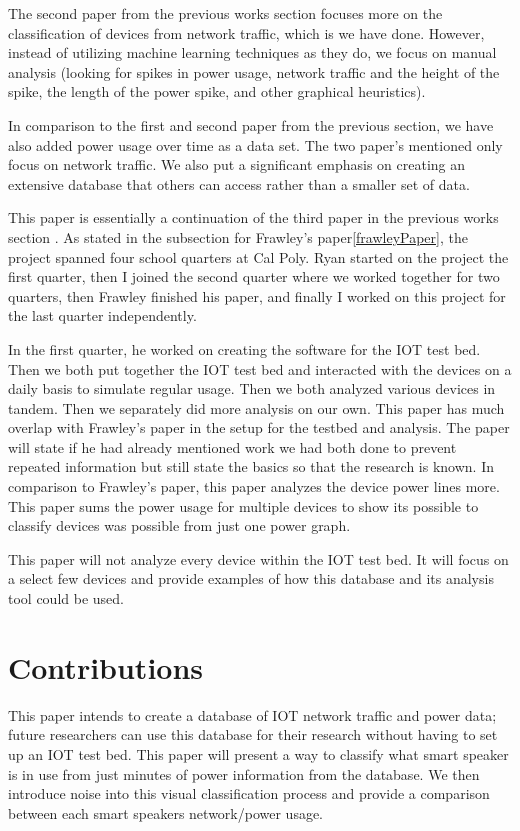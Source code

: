 The second paper from the previous works section\cite{Meidan:2017:PML:3019612.3019878} focuses more on the classification of devices from network traffic, which is we have done. However, instead of utilizing machine learning techniques as they do, we focus on manual analysis (looking for spikes in power usage, network traffic and the height of the spike, the length of the power spike, and other graphical heuristics).

In comparison to the first \cite{home_iot} and second paper \cite{Meidan:2017:PML:3019612.3019878} from the previous section, we have also added power usage over time as a data set. The two paper's mentioned only focus on network traffic. We also put a significant emphasis on creating an extensive database that others can access rather than a smaller set of data.

This paper is essentially a continuation of the third paper in the previous works section \cite{frawley_2018}. As stated in the subsection for Frawley's paper\ref{frawleyPaper}, the project spanned four school quarters at Cal Poly. Ryan started on the project the first quarter, then I joined the second quarter where we worked together for two quarters, then Frawley finished his paper, and finally I worked on this project for the last quarter independently.

In the first quarter, he worked on creating the software for the IOT test bed. Then we both put together the IOT test bed and interacted with the devices on a daily basis to simulate regular usage. Then we both analyzed various devices in tandem. Then we separately did more analysis on our own. This paper has much overlap with Frawley's paper in the setup for the testbed and analysis. The paper will state if he had already mentioned work we had both done to prevent repeated information but still state the basics so that the research is known. In comparison to Frawley's paper, this paper analyzes the device power lines more. This paper sums the power usage for multiple devices to show its possible to classify devices was possible from just one power graph.

This paper will not analyze every device within the IOT test bed. It will focus on a select few devices and provide examples of how this database and its analysis tool could be used.

\section{Contributions}
This paper intends to create a database of IOT network traffic and power data; future researchers can use this database for their research without having to set up an IOT test bed. This paper will present a way to classify what smart speaker is in use from just minutes of power information from the database. We then introduce noise into this visual classification process and provide a comparison between each smart speakers network/power usage.

